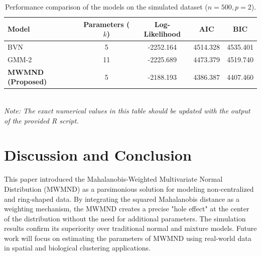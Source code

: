 \documentclass[twoside]{article}
\begin{document}
\begin{table}[h]
	\centering
	\caption{Performance comparison of the models on the simulated dataset ($n=500, p=2$).}
	\label{tab:sim_results}
	\begin{tabular}{lcccc}
		\hline
		Model & Parameters ($k$) & Log-Likelihood & AIC & BIC \\
		\hline
		BVN & 5 & -2252.164& 4514.328& 4535.401 \\
		GMM-2 & 11 & -2225.689& 4473.379& 4519.740 \\
		\textbf{MWMND (Proposed)} & 5 & -2188.193& 4386.387& 4407.460 \\
		\hline
	\end{tabular}
	\vspace{0.2cm}
	\\
	\footnotesize{\textit{Note: The exact numerical values in this table should be updated with the output of the provided R script.}}
\end{table}



\section{Discussion and Conclusion}
This paper introduced the Mahalanobis-Weighted Multivariate Normal Distribution (MWMND) as a parsimonious solution for modeling non-centralized and ring-shaped data. By integrating the squared Mahalanobis distance as a weighting mechanism, the MWMND creates a precise "hole effect" at the center of the distribution without the need for additional parameters. The simulation results confirm its superiority over traditional normal and mixture models. Future work will focus on estimating the parameters of MWMND using real-world data in spatial and biological clustering applications.
\end{document}
